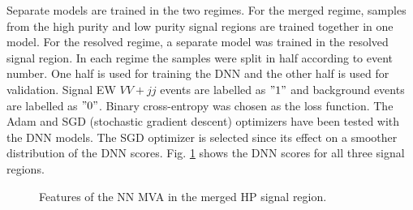 Separate models are trained in the two regimes.
For the merged regime, samples from the high purity and low purity signal regions are trained together in one model.
For the resolved regime, a separate model was trained in the resolved signal region.
In each regime the samples were split in half according to event number. One half is used for training the DNN and the other half is used for validation. Signal EW $VV+jj$ events are labelled as $"1"$ and background events are labelled as $"0"$.
Binary cross-entropy was chosen as the loss function.
The Adam and SGD (stochastic gradient descent) optimizers have been tested with the DNN models. The SGD optimizer is selected since its effect on a smoother distribution of the DNN scores. Fig. \ref{fig:1lepDNNoutputs} shows the DNN scores for all three signal regions. 

\begin{figure}[ht]
 \begin{center}
  \caption{Features of the NN MVA in the merged HP signal region.}
 \label{fig:1lepDNNoutputs}
 \end{center}
\end{figure}

